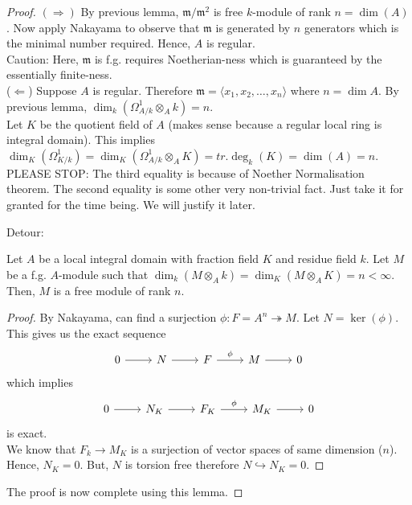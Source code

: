 \documentclass[oneside, 12pt, ]{scrbook}
\newcommand{\m}{\mathfrak{m}}
\theoremstyle{theorem}
\begin{document}
\begin{proof}
$( \Rightarrow )$ By previous lemma, $\m / \m^2$ is free $k$-module of rank $n = \dim(A)$. Now apply Nakayama to observe that $\m$ is generated by $n$ generators which is the minimal number required. Hence, $A$ is regular. \\
Caution: Here, $\m$ is f.g. requires Noetherian-ness which is guaranteed by the essentially finite-ness. \\

($\Leftarrow$)  Suppose $A$ is regular. Therefore $\m = \langle x_{1}, x_{2}, \hdots , x_{n}\rangle$ where $n = \dim A$. By previous lemma, $\dim_{k} (\Omega_{A/k}^{1} \otimes_{A} k ) = n$. \\

Let $K$ be the quotient field of $A$ (makes sense because a regular local ring is integral domain). This implies $\dim_{K}(\Omega_{K/k}^{1}) =\dim_{K}( \Omega_{A/k}^{1} \otimes_{A} K )= tr.\deg_{k}(K) = \dim(A) = n$. \\

\textcolor{BrickRed}{PLEASE STOP}: The third equality is because of Noether Normalisation theorem. The second equality is some other very non-trivial fact. Just take it for granted for the time being. We will justify it later. 

Detour: \\

\begin{lemma}
Let $A$ be a local integral domain with fraction field $K$ and residue field $k$. Let $M$ be a f.g. $A$-module such that $\dim_{k}(M \otimes_{A} k) = \dim_{K}(M \otimes_{A} K) = n < \infty$. Then, $M$ is a free module of rank $n$. 
\end{lemma}

\begin{proof}
By Nakayama, can find a surjection $\phi: F = A^n \twoheadrightarrow M$. Let $N  = \ker (\phi)$. This gives us the exact sequence
\[\begin{tikzcd}
	0 & N & F & M & 0
	\arrow[from=1-1, to=1-2]
	\arrow[from=1-2, to=1-3]
	\arrow["\phi", from=1-3, to=1-4]
	\arrow[from=1-4, to=1-5]
\end{tikzcd}\]
which implies \[\begin{tikzcd}
	0 & N_{K} & F_{K} & M_{K} & 0
	\arrow[from=1-1, to=1-2]
	\arrow[from=1-2, to=1-3]
	\arrow["\phi", from=1-3, to=1-4]
	\arrow[from=1-4, to=1-5]
\end{tikzcd}\] is exact. \\

We know that $F_{k} \rightarrow M_{K}$ is a surjection of vector spaces of same dimension ($n$). Hence, $N_{K}=0$. But, $N$ is torsion free therefore $N \hookrightarrow N_{K} =0$.
\end{proof}

The proof is now complete using this lemma.
\end{proof}
\end{document}
